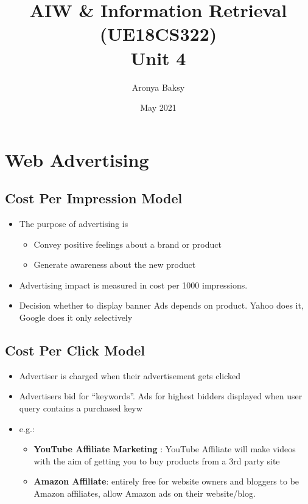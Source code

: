 \documentclass{article}
\title{AIW \& Information Retrieval (UE18CS322)\\Unit 4}
\author{Aronya Baksy}
\date{May 2021}
\begin{document}
\maketitle

\section{Web Advertising}
\subsection{Cost Per Impression Model}
\begin{itemize}
    \item The purpose of advertising is 
    \begin{itemize}
        \item Convey positive feelings about a brand or product
        
        \item Generate awareness about the new product
    \end{itemize}
    
    \item Advertising impact is measured in cost per 1000 impressions.
    
    \item Decision whether to display banner Ads depends on product. Yahoo does it, Google does it only selectively 
\end{itemize}

\subsection{Cost Per Click Model}
\begin{itemize}
    \item Advertiser is charged when their advertisement gets clicked
    
    \item Advertisers bid for “keywords”. Ads for highest bidders displayed when user query contains a purchased keyw
    
    \item e.g.:\begin{itemize}
        \item \textbf{YouTube Affiliate Marketing} : YouTube Affiliate will make videos with the aim of getting you to buy products from a 3rd party site
        
        \item \textbf{Amazon Affiliate}: entirely free for website owners and bloggers to be Amazon affiliates, allow Amazon ads on their website/blog.
    \end{itemize}
\end{itemize}
\end{document}

